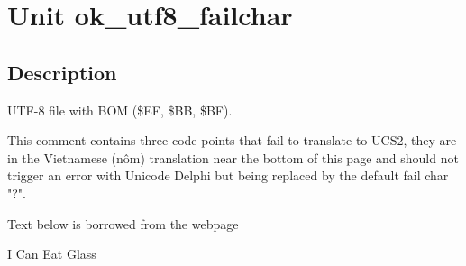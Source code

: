 \documentclass{report}
\begin{document}
\newlength{\tmplength}
\chapter{Unit ok{\_}utf8{\_}failchar}
\section{Description}
UTF{-}8 file with BOM ({\$}EF, {\$}BB, {\$}BF).

This comment contains three code points that fail to translate to UCS2, they are in the Vietnamese (nôm) translation near the bottom of this page and should not trigger an error with Unicode Delphi but being replaced by the default fail char "?".

Text below is borrowed from the webpage 

I Can Eat Glass\\{}
\end{document}
